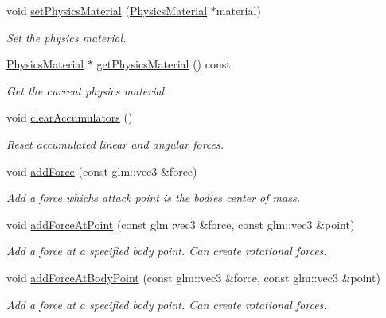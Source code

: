 \begin{DoxyCompactItemize}
void \mbox{\hyperlink{classr3_1_1_rigid_body_a9f10018dcdfe063a3bdfebdbd508efaf}{set\+Physics\+Material}} (\mbox{\hyperlink{classr3_1_1_physics_material}{Physics\+Material}} $\ast$material)
\begin{DoxyCompactList}\small\item\em Set the physics material. \end{DoxyCompactList}\item 
\mbox{\hyperlink{classr3_1_1_physics_material}{Physics\+Material}} $\ast$ \mbox{\hyperlink{classr3_1_1_rigid_body_a6a4de124959ef45fddb8809d60066ca9}{get\+Physics\+Material}} () const
\begin{DoxyCompactList}\small\item\em Get the current physics material. \end{DoxyCompactList}\item 
void \mbox{\hyperlink{classr3_1_1_rigid_body_a86bfec9a651351b27c0f53f5db56c7c4}{clear\+Accumulators}} ()
\begin{DoxyCompactList}\small\item\em Reset accumulated linear and angular forces. \end{DoxyCompactList}\item 
void \mbox{\hyperlink{classr3_1_1_rigid_body_a3ec9e7463d7c9a6607b35a334049a1e3}{add\+Force}} (const glm\+::vec3 \&force)
\begin{DoxyCompactList}\small\item\em Add a force which\textquotesingle{}s attack point is the bodies center of mass. \end{DoxyCompactList}\item 
void \mbox{\hyperlink{classr3_1_1_rigid_body_a9e8fc5409e15ae0184baf3238b97dec7}{add\+Force\+At\+Point}} (const glm\+::vec3 \&force, const glm\+::vec3 \&point)
\begin{DoxyCompactList}\small\item\em Add a force at a specified body point. Can create rotational forces. \end{DoxyCompactList}\item 
void \mbox{\hyperlink{classr3_1_1_rigid_body_abba1067c4db2d246e3f82b6c1bd35c87}{add\+Force\+At\+Body\+Point}} (const glm\+::vec3 \&force, const glm\+::vec3 \&point)
\begin{DoxyCompactList}\small\item\em Add a force at a specified body point. Can create rotational forces. \end{DoxyCompactList}\item 

\end{DoxyCompactItemize}
